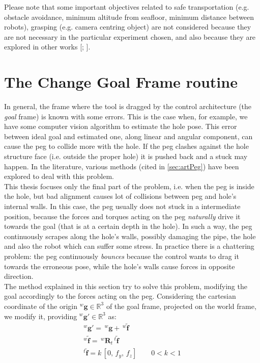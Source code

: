 Please note that some important objectives related to safe transportation (e.g. obstacle avoidance, minimum altitude from seafloor, minimum distance between robots), grasping (e.g. camera centring object) are not considered because they are not necessary in the particular experiment chosen, and also because they are explored in other works [\cite{IntroMaris2}; \cite{IntroRecent}].\\


\section{The Change Goal Frame routine}
\label{sec:changeGoal}
In general, the frame where the tool is dragged by the control architecture (the \textit{goal} frame) is known with some errors. This is the case when, for example, we have some computer vision algorithm to estimate the hole pose. 
This error between ideal goal and estimated one, along linear and angular component, can cause the peg to collide more with the hole. If the peg clashes against the hole structure face (i.e. outside the proper hole) it is pushed back and a stuck may happen. In the literature, various methods (cited in \ref{sec:artPeg}) have been explored to deal with this problem.\\
This thesis focuses only the final part of the problem, i.e. when the peg is inside the hole, but bad alignment causes lot of collisions between peg and hole's internal walls. In this case, the peg usually does not stuck in a intermediate position, because the forces and torques acting on the peg \textit{naturally} drive it towards the goal (that is at a certain depth in the hole). In such a way, the peg continuously scrapes along the hole's walls, possibly damaging the pipe, the hole and also the robot which can suffer some stress. In practice there is a chattering problem: the peg continuously \textit{bounces} 
because the control wants to drag it towards the erroneous pose, while the hole's walls cause forces in opposite direction.\\
The method explained in this section try to solve this problem, modifying the goal accordingly to the forces acting on the peg. Considering the cartesian coordinate of the origin $^{w}\boldsymbol{g} \in \mathbb{R}^{3}$ of the goal frame, projected on the world frame, we modify it, providing $^{w}\boldsymbol{g'} \in \mathbb{R}^{3}$ as:
\begin{equation}
	\label{eq:changeGoal}
	\begin{gathered}
	^{w}\boldsymbol{g'} = \,^{w}\boldsymbol{g} + \, ^{w}\boldsymbol{\tilde{f}} \\
	 ^{w}\boldsymbol{\tilde{f}} =  \,^{w}\boldsymbol{R}_t \,^{t}\boldsymbol{\tilde{f}} \\
	 ^{t}\boldsymbol{\tilde{f}} = k \, [ 0, \, f_y, \, f_z ] \qquad 0 < k < 1
%
	 \end{gathered}
\end{equation}
